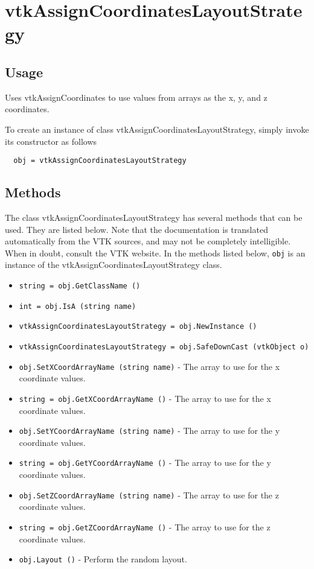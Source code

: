 \section{vtkAssignCoordinatesLayoutStrategy}

\subsection{Usage}

 Uses vtkAssignCoordinates to use values from arrays as the x, y, and z coordinates.

To create an instance of class vtkAssignCoordinatesLayoutStrategy, simply
invoke its constructor as follows
\begin{verbatim}
  obj = vtkAssignCoordinatesLayoutStrategy
\end{verbatim}
\subsection{Methods}

The class vtkAssignCoordinatesLayoutStrategy has several methods that can be used.
  They are listed below.
Note that the documentation is translated automatically from the VTK sources,
and may not be completely intelligible.  When in doubt, consult the VTK website.
In the methods listed below, \verb|obj| is an instance of the vtkAssignCoordinatesLayoutStrategy class.
\begin{itemize}
\item  \verb|string = obj.GetClassName ()|

\item  \verb|int = obj.IsA (string name)|

\item  \verb|vtkAssignCoordinatesLayoutStrategy = obj.NewInstance ()|

\item  \verb|vtkAssignCoordinatesLayoutStrategy = obj.SafeDownCast (vtkObject o)|

\item  \verb|obj.SetXCoordArrayName (string name)| -  The array to use for the x coordinate values.

\item  \verb|string = obj.GetXCoordArrayName ()| -  The array to use for the x coordinate values.

\item  \verb|obj.SetYCoordArrayName (string name)| -  The array to use for the y coordinate values.

\item  \verb|string = obj.GetYCoordArrayName ()| -  The array to use for the y coordinate values.

\item  \verb|obj.SetZCoordArrayName (string name)| -  The array to use for the z coordinate values.

\item  \verb|string = obj.GetZCoordArrayName ()| -  The array to use for the z coordinate values.

\item  \verb|obj.Layout ()| -  Perform the random layout.

\end{itemize}
